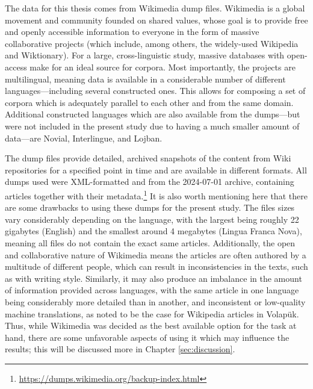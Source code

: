 \documentclass[12pt,a4paper]{article}
\numberwithin{figure}{section}
\numberwithin{table}{section}
\numberwithin{definition}{section}
\begin{document}
The data for this thesis comes from Wikimedia dump files. Wikimedia is a global movement and community founded on shared values, whose goal is to provide free and openly accessible information to everyone in the form of massive collaborative projects (which include, among others, the widely-used Wikipedia and Wiktionary). For a large, cross-linguistic study, massive databases with open-access make for an ideal source for corpora. Most importantly, the projects are multilingual, meaning data is available in a considerable number of different languages---including several constructed ones. This allows for composing a set of corpora which is adequately parallel to each other and from the same domain. Additional constructed languages which are also available from the dumps---but were not included in the present study due to having a much smaller amount of data---are Novial, Interlingue, and Lojban.

The dump files provide detailed, archived snapshots of the content from Wiki repositories for a specified point in time and are available in different formats. All dumps used were XML-formatted and from the 2024-07-01 archive, containing articles together with their metadata.\footnote{\url{https://dumps.wikimedia.org/backup-index.html}} It is also worth mentioning here that there are some drawbacks to using these dumps for the present study. The files sizes vary considerably depending on the language, with the largest being roughly 22 gigabytes (English) and the smallest around 4 megabytes (Lingua Franca Nova), meaning all files do not contain the exact same articles. Additionally, the open and collaborative nature of Wikimedia means the articles are often authored by a multitude of different people, which can result in inconsistencies in the texts, such as with writing style. Similarly, it may also produce an imbalance in the amount of information provided across languages, with the same article in one language being considerably more detailed than in another, and inconsistent or low-quality machine translations, as \textcite{Novikov2022article} noted to be the case for Wikipedia articles in Volapük. Thus, while Wikimedia was decided as the best available option for the task at hand, there are some unfavorable aspects of using it which may influence the results; this will be discussed more in Chapter \ref{sec:discussion}.

\end{document}
